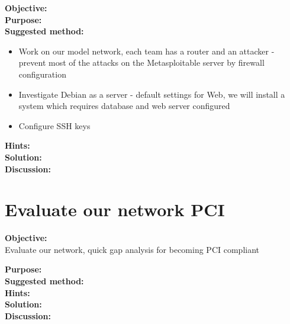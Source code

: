 \documentclass[a4paper,11pt,notitlepage]{report}
\begin{document}
{\bf Objective:}\\


{\bf Purpose:}\\


{\bf Suggested method:}\\

\begin{itemize}
\item Work on our model network, each team has a router and an attacker - prevent most of the attacks on the Metasploitable server by firewall configuration
\item Investigate Debian as a server - default settings for Web, we will install a system which requires database and web server configured
\item Configure SSH keys
\end{itemize}

{\bf Hints:}\\


{\bf Solution:}\\


{\bf Discussion:}\\





\chapter{Evaluate our network PCI}
\label{ex:PCI-evaluation}

{\bf Objective:}\\
Evaluate our network, quick gap analysis for becoming PCI compliant

{\bf Purpose:}\\


{\bf Suggested method:}\\


{\bf Hints:}\\


{\bf Solution:}\\


{\bf Discussion:}\\
\end{document}

